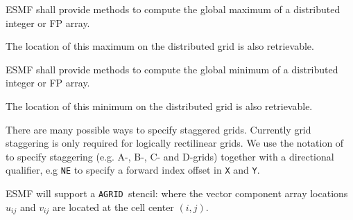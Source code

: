 



ESMF shall provide methods to compute the global maximum of a
distributed integer or FP array.


The location of this maximum on the distributed grid is also
retrievable.


ESMF shall provide methods to compute the global minimum of a
distributed integer or FP array.


The location of this minimum on the distributed grid is also
retrievable.


There are many possible ways to specify staggered grids.  Currently
grid staggering is only required for logically rectilinear grids. We
use the notation of \cite{ref:a1966} to specify staggering (e.g. A-,
B-, C- and D-grids) together with a directional qualifier, e.g
\texttt{NE} to specify a forward index offset in \texttt{X} and
\texttt{Y}.

\newcommand{\agrid}{\texttt{AGRID~}}
\newcommand{\bgrid}{\texttt{BGRID~}}
\newcommand{\cgrid}{\texttt{CGRID~}}
\newcommand{\dgrid}{\texttt{DGRID~}}

\sreq{\agrid}

ESMF will support a \agrid stencil: where the vector
component array locations $u_{ij}$ and $v_{ij}$ are located at the
cell center $(i,j)$.

\sreq{\bgrid}

